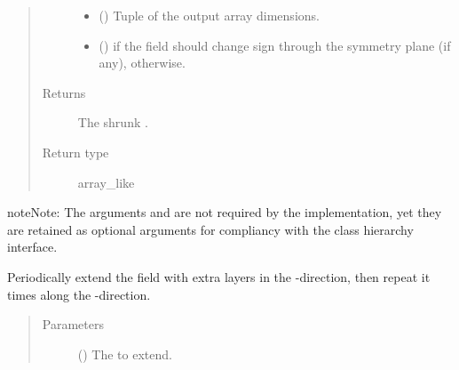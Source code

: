 \documentclass[letterpaper,10pt,english]{sphinxmanual}
\begin{document}
\begin{fulllineitems}
\begin{fulllineitems}
\begin{quote}
\begin{description}
\begin{itemize}
\item {} 
 () \textendash{} Tuple of the output array dimensions.

\item {} 
 () \textendash{}  if the field should change sign through the symmetry plane (if any),  otherwise.

\end{itemize}

\item[{Returns}] \leavevmode
The shrunk .

\item[{Return type}] \leavevmode
array\_like

\end{description}\end{quote}

\begin{sphinxadmonition}{note}{Note:}
The arguments  and  are not required by the implementation,
yet they are retained as optional arguments for compliancy with the class hierarchy interface.
\end{sphinxadmonition}

\end{fulllineitems}


\begin{fulllineitems}
\label{\detokenize{api:dycore.horizontal_boundary.PeriodicXZ.from_physical_to_computational_domain}}
Periodically extend the field  with  extra layers in the -direction,
then repeat it  times along the -direction.
\begin{quote}\begin{description}
\item[{Parameters}] \leavevmode
{} () \textendash{} The  to extend.


\end{description}
\end{quote}
\end{fulllineitems}
\end{fulllineitems}
\end{document}
